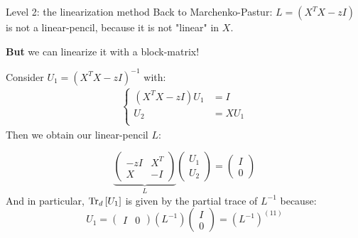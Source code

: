 \documentclass[10pt]{beamer}
\begin{document}
\begin{frame}{Level 2: the linearization method}
  Back to Marchenko-Pastur: $L = (X^TX - zI)$ is not a linear-pencil, because it is not "linear" in $X$.
  
  \textbf{But} we can linearize it with a block-matrix!

  Consider $U_1 = (X^TX - zI)^{-1}$ with:
  \begin{align*}
    \begin{cases}
      (X^TX - zI) U_1 & = I\\
      U_2 & = X U_1\\
    \end{cases}
  \end{align*}
  \vspace*{-0.1cm}
  Then we obtain our linear-pencil $L$:

  \begin{equation*}
    \underbrace{
    \begin{pmatrix}
      -zI & X^T\\
      X & -I
    \end{pmatrix}
    }_{L}
    \begin{pmatrix}
      U_1\\
      U_2
    \end{pmatrix}
    = \begin{pmatrix}
      I\\
      0
    \end{pmatrix}
  \end{equation*}
  And in particular, $\traceLim[d]{U_1}$ is given by the partial trace of $L^{-1}$ because:
  \begin{equation*}
    U_1 = \begin{pmatrix}
      I & 0
    \end{pmatrix}
    (L^{-1})
    \begin{pmatrix}
      I\\
      0
    \end{pmatrix}
    = (L^{-1})^{(11)}
  \end{equation*}
\end{frame}
\end{document}

